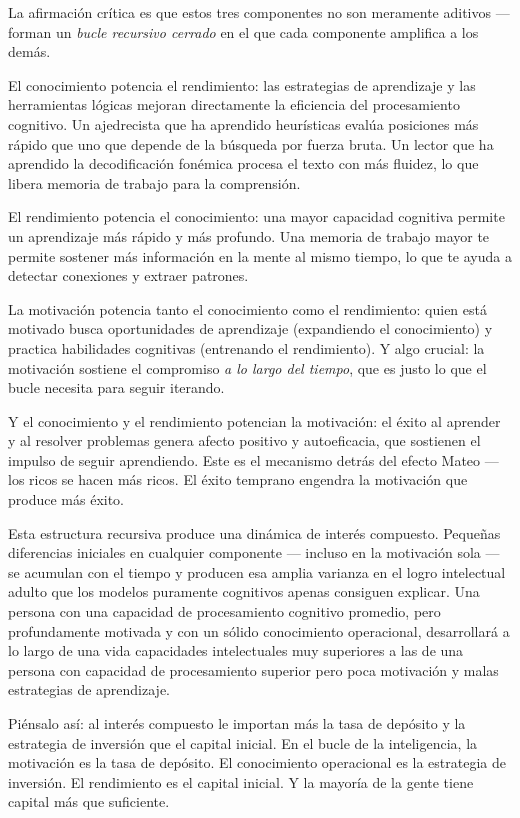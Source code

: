\documentclass[11pt, twoside, openright]{book}
\begin{document}
La afirmación crítica es que estos tres componentes no son meramente aditivos --- forman un \textit{bucle recursivo cerrado} en el que cada componente amplifica a los demás.

El conocimiento potencia el rendimiento: las estrategias de aprendizaje y las herramientas lógicas mejoran directamente la eficiencia del procesamiento cognitivo. Un ajedrecista que ha aprendido heurísticas evalúa posiciones más rápido que uno que depende de la búsqueda por fuerza bruta. Un lector que ha aprendido la decodificación fonémica procesa el texto con más fluidez, lo que libera memoria de trabajo para la comprensión.

El rendimiento potencia el conocimiento: una mayor capacidad cognitiva permite un aprendizaje más rápido y más profundo. Una memoria de trabajo mayor te permite sostener más información en la mente al mismo tiempo, lo que te ayuda a detectar conexiones y extraer patrones.

La motivación potencia tanto el conocimiento como el rendimiento: quien está motivado busca oportunidades de aprendizaje (expandiendo el conocimiento) y practica habilidades cognitivas (entrenando el rendimiento). Y algo crucial: la motivación sostiene el compromiso \textit{a lo largo del tiempo}, que es justo lo que el bucle necesita para seguir iterando.

Y el conocimiento y el rendimiento potencian la motivación: el éxito al aprender y al resolver problemas genera afecto positivo y autoeficacia, que sostienen el impulso de seguir aprendiendo. Este es el mecanismo detrás del efecto Mateo --- los ricos se hacen más ricos. El éxito temprano engendra la motivación que produce más éxito.

Esta estructura recursiva produce una dinámica de interés compuesto. Pequeñas diferencias iniciales en cualquier componente --- incluso en la motivación sola --- se acumulan con el tiempo y producen esa amplia varianza en el logro intelectual adulto que los modelos puramente cognitivos apenas consiguen explicar. Una persona con una capacidad de procesamiento cognitivo promedio, pero profundamente motivada y con un sólido conocimiento operacional, desarrollará a lo largo de una vida capacidades intelectuales muy superiores a las de una persona con capacidad de procesamiento superior pero poca motivación y malas estrategias de aprendizaje.

Piénsalo así: al interés compuesto le importan más la tasa de depósito y la estrategia de inversión que el capital inicial. En el bucle de la inteligencia, la motivación es la tasa de depósito. El conocimiento operacional es la estrategia de inversión. El rendimiento es el capital inicial. Y la mayoría de la gente tiene capital más que suficiente.
\end{document}
